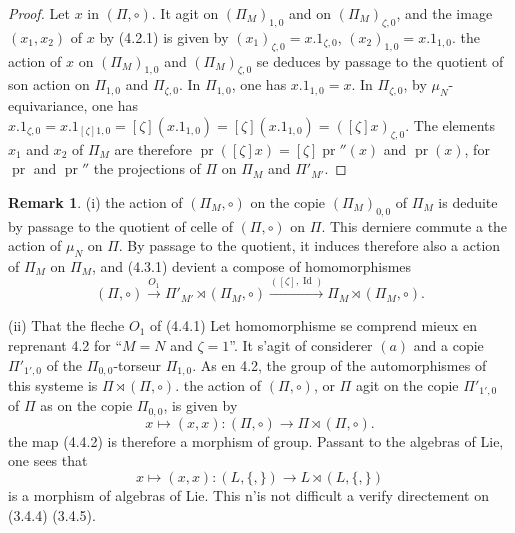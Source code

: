 \documentclass[11pt,a4paper]{article}
\theoremstyle{plain}
\theoremstyle{definition}
\newtheorem{remark}[theorem]{Remark}
\DeclareMathOperator{\pr}{pr}
\DeclareMathOperator{\Id}{Id}
\begin{document}
\begin{proof}
Let $x$ in $(\Pi, \circ)$. It agit on $(\Pi_M)_{1,0}$ and on $(\Pi_M)_{\zeta,0}$, and the image $(x_1, x_2)$ of $x$ by (4.2.1) is given by $(x_1)_{\zeta,0} = x.1_{\zeta,0}$, $(x_2)_{1,0} = x.1_{1,0}$. the action of $x$ on $(\Pi_M)_{1,0}$ and $(\Pi_M)_{\zeta,0}$ se deduces by passage to the quotient of son action on $\Pi_{1,0}$ and $\Pi_{\zeta,0}$. In $\Pi_{1,0}$, one has $x.1_{1,0} = x$. In $\Pi_{\zeta,0}$, by $\mu_N$-equivariance, one has $x.1_{\zeta,0} = x.1_{[\zeta]1,0} = [\zeta](x.1_{1,0}) = [\zeta](x.1_{1,0}) = ([\zeta]x)_{\zeta,0}$. The elements $x_1$ and $x_2$ of $\Pi_M$ are therefore $\pr([\zeta]x) = [\zeta]\pr''(x)$ and $\pr(x)$, for $\pr$ and $\pr''$ the projections of $\Pi$ on $\Pi_M$ and $\Pi'_{M'}$.
\end{proof}

\begin{remark}\label{rmk:4.4}
(i) the action of $(\Pi_M, \circ)$ on the copie $(\Pi_M)_{0,0}$ of $\Pi_M$ is deduite by passage to the quotient of celle of $(\Pi, \circ)$ on $\Pi$. This derniere commute a the action of $\mu_N$ on $\Pi$. By passage to the quotient, it induces therefore also a action of $\Pi_M$ on $\Pi_M$, and (4.3.1) devient a compose of homomorphismes
\begin{equation}\label{eq:4.4.1}
(\Pi, \circ) \xrightarrow{O_1} \Pi'_{M'} \rtimes (\Pi_M, \circ) \xrightarrow{([\zeta], \Id)} \Pi_M \rtimes (\Pi_M, \circ).
\end{equation}

(ii) That the fleche $O_1$ of (4.4.1) Let homomorphisme se comprend mieux en reprenant 4.2 for ``$M=N$ and $\zeta=1$''. It s'agit of considerer $(a)$ and a copie $\Pi'_{1',0}$ of the $\Pi_{0,0}$-torseur $\Pi_{1,0}$. As en 4.2, the group of the automorphismes of this systeme is $\Pi \rtimes (\Pi, \circ)$. the action of $(\Pi, \circ)$, or $\Pi$ agit on the copie $\Pi'_{1',0}$ of $\Pi$ as on the copie $\Pi_{0,0}$, is given by
\begin{equation}\label{eq:4.4.2}
x \mapsto (x,x): (\Pi, \circ) \to \Pi \rtimes (\Pi, \circ).
\end{equation}
the map (4.4.2) is therefore a morphism of group. Passant to the algebras of Lie, one sees that
\begin{equation}\label{eq:4.4.3}
x \mapsto (x,x): (L, \{,\}) \to L \rtimes (L, \{,\})
\end{equation}
is a morphism of algebras of Lie. This n'is not difficult a verify directement on (3.4.4) (3.4.5).
\end{remark}
\end{document}

